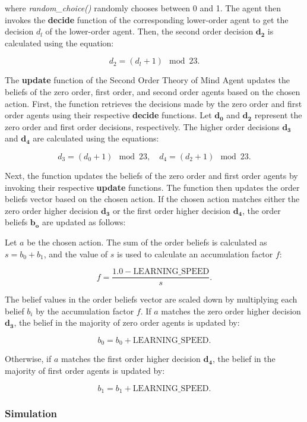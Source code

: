 where \textit{random\_choice()} randomly chooses between 0 and 1. The agent then invokes the \textbf{decide} function of the corresponding lower-order agent to get the decision $d_l$ of the lower-order agent. Then, the second order decision $\mathbf{d_2}$  is calculated using the equation:

\label{eq:second-order-decide}
\[
d_2 = (d_l + 1) \mod 23.
\]

The \textbf{update} function of the Second Order Theory of Mind Agent updates the beliefs of the zero order, first order, and second order agents based on the chosen action. First, the function retrieves the decisions made by the zero order and first order agents using their respective \textbf{decide} functions. Let $\mathbf{d_0}$ and $\mathbf{d_2}$ represent the zero order and first order decisions, respectively. The higher order decisions $\mathbf{d_3}$ and $\mathbf{d_4}$ are calculated using the equations:

\[
d_3 = (d_0 + 1) \mod 23, \quad d_4 = (d_2 + 1) \mod 23.
\]

Next, the function updates the beliefs of the zero order and first order agents by invoking their respective \textbf{update} functions. The function then updates the order beliefs vector based on the chosen action. If the chosen action matches either the zero order higher decision $\mathbf{d_3}$ or the first order higher decision $\mathbf{d_4}$, the order beliefs $\mathbf{b_o}$ are updated as follows:

Let $a$ be the chosen action. The sum of the order beliefs is calculated as $s = b_0 + b_1$, and the value of $s$ is used to calculate an accumulation factor $f$:

\[
f = \frac{{1.0 - \text{{LEARNING\_SPEED}}}}{s}.
\]

The belief values in the order beliefs vector are scaled down by multiplying each belief $b_i$ by the accumulation factor $f$. If $a$ matches the zero order higher decision $\mathbf{d_3}$, the belief in the majority of zero order agents is updated by:

\[
b_0 = b_0 + \text{{LEARNING\_SPEED}}.
\]

Otherwise, if $a$ matches the first order higher decision $\mathbf{d_4}$, the belief in the majority of first order agents is updated by:

\[
b_1 = b_1 + \text{{LEARNING\_SPEED}}.
\]

\subsubsection{Simulation}

